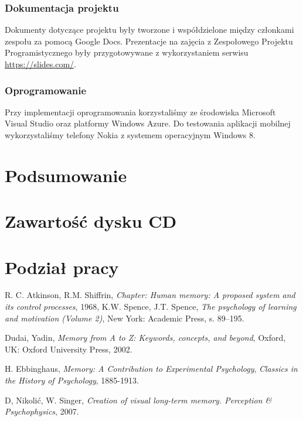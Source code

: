 \documentclass{pracamgr}
\begin{document}
\subsection{Dokumentacja projektu}
Dokumenty dotyczące projektu były tworzone i współdzielone między członkami zespołu za pomocą Google Docs. Prezentacje na zajęcia z Zespołowego Projektu Programistycznego były przygotowywane z wykorzystaniem serwisu \url{https://slides.com/}.

\subsection{Oprogramowanie}
Przy implementacji oprogramowania korzystaliśmy ze środowiska Microsoft Visual Studio oraz platformy Windows Azure. Do testowania aplikacji mobilnej wykorzystaliśmy telefony Nokia z systemem operacyjnym Windows 8.

\chapter{Podsumowanie}

\appendix

\chapter{Zawartość dysku CD}

\chapter{Podział pracy}

\begin{thebibliography}{99}

 R. C. Atkinson, R.M. Shiffrin, \textit{Chapter: Human memory: A proposed system and its control processes}, 1968, K.W. Spence, J.T. Spence, \textit{The psychology of learning and motivation (Volume 2)}, New York: Academic Press, s. 89–195.

 Dudai, Yadin, \textit{Memory from A to Z: Keywords, concepts, and beyond}, Oxford, UK: Oxford University Press, 2002.

 H. Ebbinghaus, \textit{Memory: A Contribution to Experimental Psychology}, \textit{Classics in the History of Psychology}, 1885-1913.


 D, Nikolić, W. Singer, \textit{Creation of visual long-term memory. Perception \& Psychophysics}, 2007.


\end{thebibliography}
\end{document}
